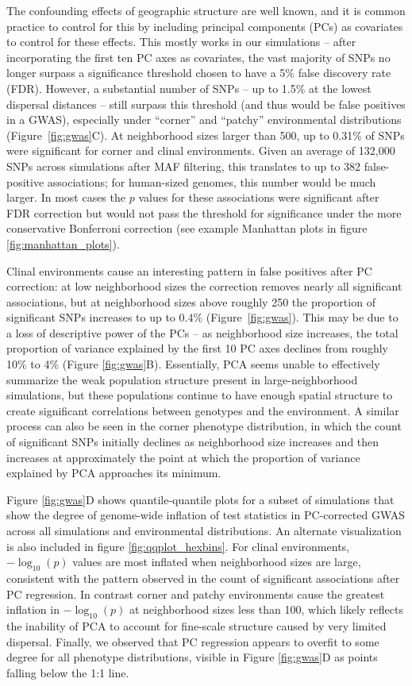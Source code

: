 \documentclass[10pt,twoside,lineno,hidelinks]{preprint}
\begin{document}
The confounding effects of geographic structure are well known, 
and it is common practice to control for this by including principal components (PCs) as covariates to control for these effects.
This mostly works in our simulations -- after incorporating the first ten PC axes as covariates, the vast majority of SNPs no longer surpass a significance threshold chosen to have a 5\% false discovery rate (FDR).
However, a substantial number of SNPs -- up to 1.5\% at the lowest dispersal distances -- still surpass this threshold (and thus would be false positives in a GWAS),
especially under ``corner'' and ``patchy'' environmental distributions (Figure~\ref{fig:gwas}C). 
At neighborhood sizes larger than 500, up to 0.31\% of SNPs were significant for corner and clinal environments. 
Given an average of 132,000 SNPs across simulations after MAF filtering, this translates to up to 382 false-positive associations; for human-sized genomes, this number would be much larger.
In most cases the $p$ values for these associations were significant after FDR correction but would not pass the threshold for significance under the more conservative Bonferroni correction (see example Manhattan plots in figure \ref{fig:manhattan_plots}).

Clinal environments cause an interesting pattern in false positives after PC correction: at low neighborhood sizes the correction removes nearly all significant associations, 
but at neighborhood sizes above roughly 250 the proportion of significant SNPs increases to up to 0.4\% (Figure~\ref{fig:gwas}). 
This may be due to a loss of descriptive power of the PCs
-- as neighborhood size increases, the total proportion of variance explained by the first 10 PC axes declines from roughly 10\% to 4\% (Figure \ref{fig:gwas}B). 
Essentially, PCA seems unable to effectively summarize the weak population structure present in large-neighborhood simulations, but these populations continue to have enough spatial structure to create significant correlations between genotypes and the environment. A similar process can also be seen in the corner phenotype distribution, in which the count of significant SNPs initially declines as neighborhood size increases and then increases at approximately the point at which the proportion of variance explained by PCA approaches its minimum. 

Figure \ref{fig:gwas}D shows quantile-quantile plots for a subset of simulations that show the degree of genome-wide inflation of test statistics in PC-corrected GWAS across all simulations and environmental distributions. 
An alternate visualization is also included in figure \ref{fig:qqplot_hexbins}.
For clinal environments, $-\log_{10}(p)$ values are most inflated when neighborhood sizes are large, consistent with the pattern observed in the count of significant associations after PC regression. In contrast corner and patchy environments cause the greatest inflation in $-\log_{10}(p)$ at neighborhood sizes less than 100, which likely reflects the inability of PCA to account for fine-scale structure caused by very limited dispersal. Finally, we observed that PC regression appears to overfit to some degree for all phenotype distributions, visible in Figure \ref{fig:gwas}D as points falling below the 1:1 line.
\end{document}
